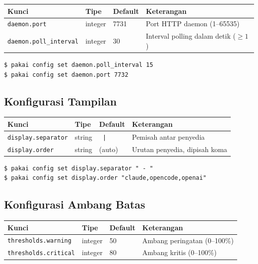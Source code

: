 \begin{center}
\begin{tabular}{lllp{5cm}}
\toprule
\textbf{Kunci} & \textbf{Tipe} & \textbf{Default} & \textbf{Keterangan} \\
\midrule
\texttt{daemon.port} & integer & 7731 & Port HTTP daemon (1--65535) \\
\texttt{daemon.poll\_interval} & integer & 30 & Interval polling dalam detik ($\geq 1$) \\
\bottomrule
\end{tabular}
\end{center}

\begin{lstlisting}[style=terminal]
$ pakai config set daemon.poll_interval 15
$ pakai config set daemon.port 7732
\end{lstlisting}

\subsection{Konfigurasi Tampilan}

\begin{center}
\begin{tabular}{lllp{5cm}}
\toprule
\textbf{Kunci} & \textbf{Tipe} & \textbf{Default} & \textbf{Keterangan} \\
\midrule
\texttt{display.separator} & string & \texttt{ | } & Pemisah antar penyedia \\
\texttt{display.order} & string & (auto) & Urutan penyedia, dipisah koma \\
\bottomrule
\end{tabular}
\end{center}

\begin{lstlisting}[style=terminal]
$ pakai config set display.separator " - "
$ pakai config set display.order "claude,opencode,openai"
\end{lstlisting}

\subsection{Konfigurasi Ambang Batas}

\begin{center}
\begin{tabular}{lllp{5cm}}
\toprule
\textbf{Kunci} & \textbf{Tipe} & \textbf{Default} & \textbf{Keterangan} \\
\midrule
\texttt{thresholds.warning} & integer & 50 & Ambang peringatan (0--100\%) \\
\texttt{thresholds.critical} & integer & 80 & Ambang kritis (0--100\%) \\
\bottomrule
\end{tabular}
\end{center}

